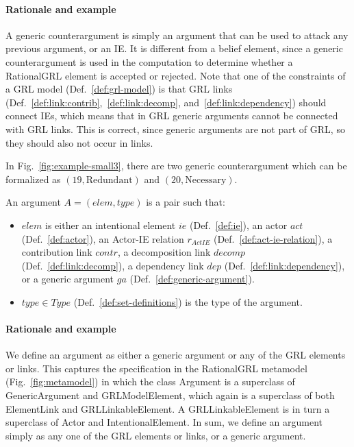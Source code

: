 \paragraph{Rationale and example} A generic counterargument is simply an argument that can be used to attack any previous argument, or an IE. It is different from a belief element, since a generic counterargument is used in the computation to determine whether a RationalGRL element is accepted or rejected. Note that one of the constraints of a GRL model (Def.~\ref{def:grl-model}) is that GRL links (Def.~\ref{def:link:contrib},~\ref{def:link:decomp}, and~\ref{def:link:dependency}) should connect IEs, which means that in GRL generic arguments cannot be connected with GRL links. This is correct, since generic arguments are not part of GRL, so they should also not occur in links. 

In Fig.~\ref{fig:example-small3}, there are two generic counterargument which can be formalized as $(19, \text{Redundant})$ and $(20, \text{Necessary})$.

\begin{definition}[Argument]
\label{def:argument}
An argument $A=(elem,type)$ is a pair such that:
\begin{itemize}
\item $elem$ is either an intentional element $ie$ (Def.~\ref{def:ie}), an actor $act$ (Def.~\ref{def:actor}), an Actor-IE relation $r_{ActIE}$ (Def.~\ref{def:act-ie-relation}),  a contribution link $contr$, a decomposition link $decomp$ (Def.~\ref{def:link:decomp}), a dependency link $dep$ (Def.~\ref{def:link:dependency}), or a generic argument $ga$ (Def.~\ref{def:generic-argument}).
\item $type\in Type$ (Def.~\ref{def:set-definitions}) is the type of the argument.
\end{itemize}
\end{definition}

\paragraph{Rationale and example} We define an argument as either a generic argument or any of the GRL elements or links. This captures the specification in the RationalGRL metamodel (Fig.~\ref{fig:metamodel}) in which the class \textsf{Argument} is a superclass of \textsf{GenericArgument} and \textsf{GRLModelElement}, which again is a superclass of both \textsf{ElementLink} and \textsf{GRLLinkableElement}. A \textsf{GRLLinkableElement} is in turn a superclass of \textsf{Actor} and \textsf{IntentionalElement}. In sum, we define an argument simply as any one of the GRL elements or links, or a generic argument.

